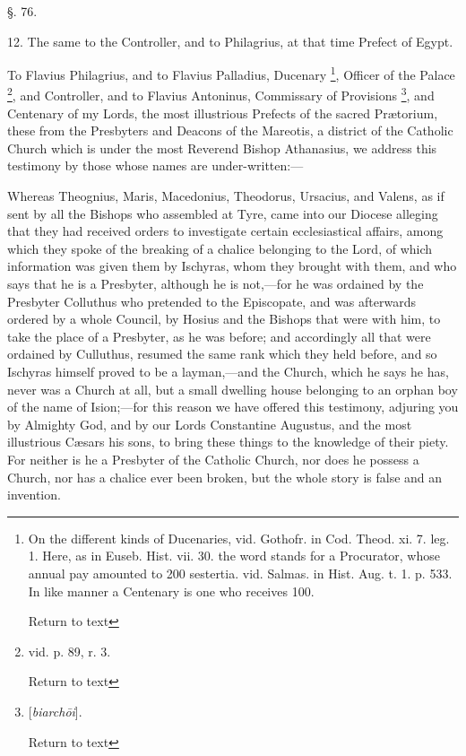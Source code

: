 §. 76.

12. The same to the Controller, and to Philagrius,
at that time Prefect of Egypt.

To Flavius Philagrius, and to Flavius Palladius,
Ducenary \footnote{On the different kinds of Ducenaries, vid. Gothofr. in Cod. Theod. xi.
7. leg. 1. Here, as in Euseb. Hist. vii. 30. the word stands for a
Procurator, whose annual pay amounted to 200 sestertia. vid. Salmas.
in Hist. Aug. t. 1. p. 533. In like manner a Centenary is one who
receives 100.

Return to text}, Officer of the
Palace \footnote{vid. p. 89, r. 3.

Return to text}, and
Controller, and to Flavius Antoninus, Commissary of Provisions \footnote{[\emph{biarch\={o}i}].

Return to text}, and Centenary of my Lords, the most illustrious Prefects of
the sacred Prætorium, these from the Presbyters and Deacons of the
Mareotis, a district of the Catholic Church which is under the
most Reverend Bishop Athanasius, we address this testimony by those
whose names are under-written:—

Whereas Theognius, Maris, Macedonius, Theodorus,
Ursacius, and Valens, as if sent by all the Bishops who assembled at
Tyre, came into our Diocese alleging that they had received orders to
investigate certain ecclesiastical affairs, among which they spoke of
the breaking of a chalice belonging to the Lord, of which information
was given them by Ischyras, whom they brought with them, and who says
that he is a Presbyter, although he is not,—for he was ordained by
the Presbyter Colluthus who pretended to the Episcopate, and was
afterwards ordered by a whole Council, by Hosius and the Bishops that
were with him, to take the place of a Presbyter, as he was before; and
accordingly all that were ordained by Culluthus, resumed the same rank
which they held before, and so Ischyras himself proved to be a
layman,—and the Church, which he says he has, never was a Church at
all, but a small dwelling house belonging to an orphan boy of the name
of Ision;—for this reason we have offered this testimony, adjuring
you by Almighty God, and by our Lords Constantine Augustus, and the
most illustrious Cæsars his sons, to bring these things to the
knowledge of their piety. For neither is he a Presbyter of the
Catholic Church, nor does he possess a Church, nor has a chalice ever
been broken, but the whole story is false and an invention.

